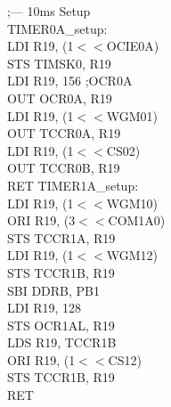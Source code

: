 \documentclass[titlepage, a4paper, 10pt, reqno, openany]{report}
\begin{document}
\begin{minipage}[t]{.45\linewidth}
;--- 10ms Setup \\
TIMER0A\_setup: \\
\hspace*{.5cm}	LDI R19, (1$<<$OCIE0A) \\
\hspace*{.5cm}	STS TIMSK0, R19 \\
\hspace*{.5cm}	LDI R19, 156 ;OCR0A \\
\hspace*{.5cm}	OUT OCR0A, R19 \\
\hspace*{.5cm}	LDI R19, (1$<<$WGM01) \\
\hspace*{.5cm}	OUT TCCR0A, R19 \\
\hspace*{.5cm}	LDI R19, (1$<<$CS02) \\
\hspace*{.5cm}	OUT TCCR0B, R19 \\
\hspace*{.5cm}	RET
\newline
TIMER1A\_setup: \\
\hspace*{.5cm}	LDI R19, (1$<<$WGM10) \\
\hspace*{.5cm}	ORI R19, (3$<<$COM1A0) \\
\hspace*{.5cm}	STS TCCR1A, R19 \\
\hspace*{.5cm}	LDI R19, (1$<<$WGM12) \\
\hspace*{.5cm}	STS TCCR1B, R19 \\
\hspace*{.5cm}	SBI DDRB, PB1 \\
\hspace*{.5cm}	LDI R19, 128 \\
\hspace*{.5cm}	STS OCR1AL, R19 \\
\hspace*{.5cm}	LDS R19, TCCR1B \\
\hspace*{.5cm}	ORI R19, (1$<<$CS12) \\
\hspace*{.5cm}	STS TCCR1B, R19 \\
\hspace*{.5cm}	RET \\
\newline

\end{minipage}
\end{document}
